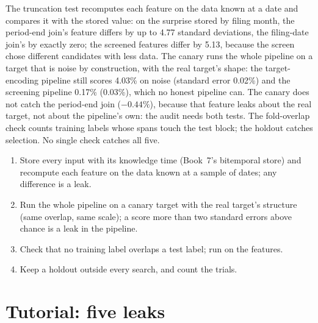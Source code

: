 The truncation test recomputes each feature on the data known at a date and compares it with the stored value: on the
surprise stored by filing month, the period-end join's feature differs by up to 4.77 standard deviations, the filing-date
join's by exactly zero; the screened features differ by 5.13, because the screen chose different candidates with less
data. The canary runs the whole pipeline on a target that is noise by construction, with the real target's shape: the
target-encoding pipeline still scores 4.03\% on noise (standard error 0.02\%) and the screening pipeline 0.17\% (0.03\%),
which no honest pipeline can. The canary does not catch the period-end join ($-0.44\%$), because that feature leaks
about the real target, not about the pipeline's own: the audit needs both tests. The fold-overlap check counts training
labels whose spans touch the test block; the holdout catches selection. No single check catches all five.

\begin{method}\label{met:ml:validation:audit}
\begin{enumerate}
\item Store every input with its knowledge time (Book~7's bitemporal store) and recompute each feature on the data
known at a sample of dates; any difference is a leak.
\item Run the whole pipeline on a canary target with the real target's structure (same overlap, same scale); a score
more than two standard errors above chance is a leak in the pipeline.
\item Check that no training label overlaps a test label; run  on the features.
\item Keep a holdout outside every search, and count the trials.
\end{enumerate}
\end{method}

\section{Tutorial: five leaks}\label{tut:ml:validation:tut}

